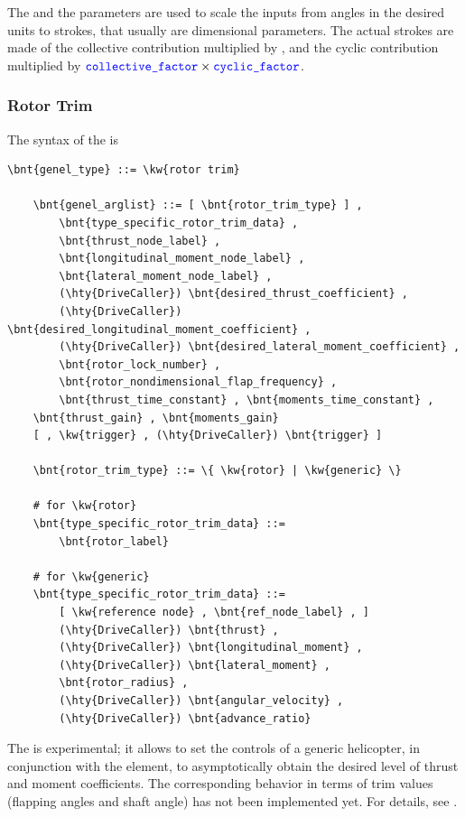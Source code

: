 The  and the  parameters are
used to scale the inputs from angles in the desired units to strokes, that
usually are dimensional parameters. The actual strokes are made of the
collective contribution multiplied by , and the
cyclic contribution multiplied by
$\textcolor{blue}{\texttt{collective\_factor}} \times \textcolor{blue}{\texttt{cyclic\_factor}}$.

\subsubsection{Rotor Trim}
\label{sec:EL:GENEL:ROTOR-TRIM}
The syntax of the  is
\begin{Verbatim}[commandchars=\\\{\}]
    \bnt{genel_type} ::= \kw{rotor trim}

    \bnt{genel_arglist} ::= [ \bnt{rotor_trim_type} ] ,
        \bnt{type_specific_rotor_trim_data} ,
        \bnt{thrust_node_label} ,
        \bnt{longitudinal_moment_node_label} ,
        \bnt{lateral_moment_node_label} ,
        (\hty{DriveCaller}) \bnt{desired_thrust_coefficient} ,
        (\hty{DriveCaller}) \bnt{desired_longitudinal_moment_coefficient} ,
        (\hty{DriveCaller}) \bnt{desired_lateral_moment_coefficient} ,
        \bnt{rotor_lock_number} ,
        \bnt{rotor_nondimensional_flap_frequency} ,
        \bnt{thrust_time_constant} , \bnt{moments_time_constant} ,
	\bnt{thrust_gain} , \bnt{moments_gain}
	[ , \kw{trigger} , (\hty{DriveCaller}) \bnt{trigger} ]

    \bnt{rotor_trim_type} ::= \{ \kw{rotor} | \kw{generic} \}

    # for \kw{rotor}
    \bnt{type_specific_rotor_trim_data} ::=
        \bnt{rotor_label}

    # for \kw{generic}
    \bnt{type_specific_rotor_trim_data} ::=
        [ \kw{reference node} , \bnt{ref_node_label} , ]
        (\hty{DriveCaller}) \bnt{thrust} ,
        (\hty{DriveCaller}) \bnt{longitudinal_moment} ,
        (\hty{DriveCaller}) \bnt{lateral_moment} ,
        \bnt{rotor_radius} ,
        (\hty{DriveCaller}) \bnt{angular_velocity} ,
        (\hty{DriveCaller}) \bnt{advance_ratio}
\end{Verbatim}
The  is experimental; it allows to set the controls 
of a generic helicopter, in conjunction with the 
element, to asymptotically obtain the desired level of thrust and
moment coefficients.
The corresponding behavior in terms of trim values (flapping angles
and shaft angle) has not been implemented yet.
For details, see \cite{PETERS-TRIM90}.







